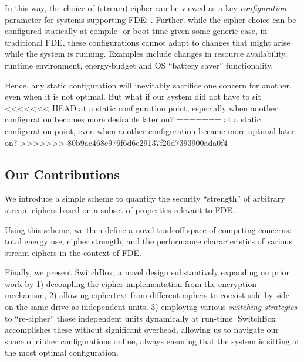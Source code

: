 In this way, the choice of (stream) cipher can be viewed as a key
\emph{configuration} parameter for systems supporting FDE; . Further, while the
cipher choice can be configured statically at compile- or boot-time given some
generic case, in traditional FDE, these configurations cannot adapt to changes
that might arise while the system is running. Examples include changes in
resource availability, runtime environment, energy-budget and OS ``battery
saver'' functionality.

Hence, any static configuration will inevitably sacrifice one concern for
another, even when it is not optimal. But what if our system did not have to sit
<<<<<<< HEAD
at a static configuration point, especially when another configuration becomes more
desirable later on?
=======
at a static configuration point, even when another configuration became more
optimal later on?
>>>>>>> 80b9ac468e976f6d6e29137f26d7393900ada0f4

\subsection{Our Contributions}

We introduce a simple scheme to quantify the security ``strength'' of
arbitrary stream ciphers based on a subset of properties relevant to
FDE.

Using this scheme, we then define a novel tradeoff space of competing concerns:
total energy use, cipher strength, and the performance
characteristics of various stream ciphers in the context of FDE.

Finally, we present SwitchBox, a novel design substantively expanding on prior
work by 1) decoupling the cipher implementation from the encryption mechanism,
2) allowing ciphertext from different ciphers to coexist side-by-side on the
same drive as independent units, 3) employing various \emph{switching
strategies} to ``re-cipher'' those independent units dynamically at run-time.
SwitchBox accomplishes these without significant overhead, allowing us to
navigate our space of cipher configurations online, always ensuring that the
system is sitting at the most optimal configuration.


